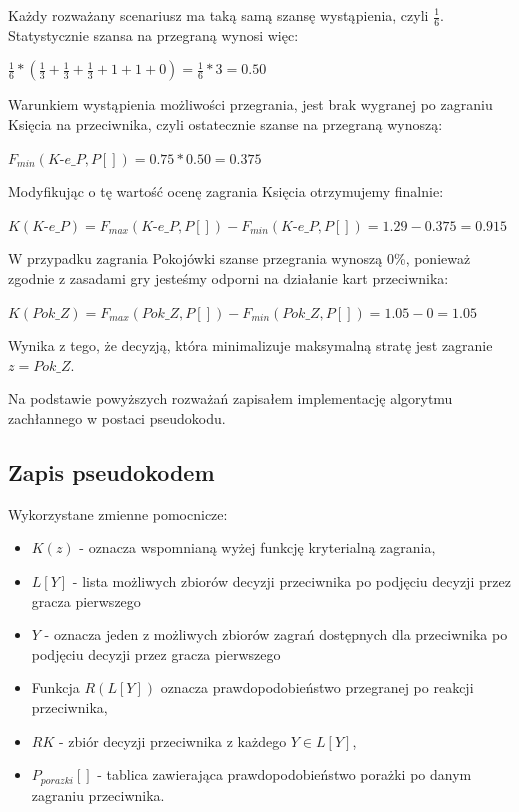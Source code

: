 Każdy rozważany scenariusz ma taką samą szansę wystąpienia, czyli $\frac{1}{6}$. Statystycznie szansa na przegraną wynosi więc:
\begin{center}
 $\frac{1}{6} * (\frac{1}{3} + \frac{1}{3} + \frac{1}{3} + 1 + 1 + 0) = \frac{1}{6} * 3 = 0.50 $
\end{center}
Warunkiem wystąpienia możliwości przegrania, jest brak wygranej po zagraniu Księcia na przeciwnika, czyli ostatecznie szanse na przegraną wynoszą:
\begin{center}
	$F_{min}(\textit{K-e\_P}, P[]) = 0.75 * 0.50 = 0.375$
\end{center}
Modyfikując o tę wartość ocenę zagrania Księcia otrzymujemy finalnie:
\begin{center}
	$K(\textit{K-e\_P}) =  F_{max}(\textit{K-e\_P}, P[]) - F_{min}(\textit{K-e\_P}, P[]) = 1.29 - 0.375 = 0.915$
\end{center} 
W przypadku zagrania Pokojówki szanse przegrania wynoszą 0\%, ponieważ zgodnie z zasadami gry jesteśmy odporni na działanie kart przeciwnika:
\begin{center}
	$K(Pok\_Z) =  F_{max}(Pok\_Z, P[]) - F_{min}(Pok\_Z, P[]) = 1.05 - 0 = 1.05$
\end{center} 
Wynika z tego, że decyzją, która minimalizuje maksymalną stratę jest zagranie $z = Pok\_Z$.

Na podstawie powyższych rozważań zapisałem implementację algorytmu zachłannego w postaci pseudokodu.
\subsection{Zapis pseudokodem}
Wykorzystane zmienne pomocnicze:
\begin{itemize}
	\item $K(z)$ - oznacza wspomnianą wyżej funkcję kryterialną zagrania, 
	\item $L[Y]$ - lista możliwych zbiorów decyzji przeciwnika po podjęciu decyzji przez gracza pierwszego
	\item $Y$ - oznacza jeden z możliwych zbiorów zagrań dostępnych dla przeciwnika po podjęciu decyzji przez gracza pierwszego
	\item Funkcja $R(L[Y])$ oznacza prawdopodobieństwo przegranej po reakcji przeciwnika,
	\item $RK$ - zbiór decyzji przeciwnika z każdego $Y \in L[Y]$,
	\item $P_{porazki}[]$ - tablica zawierająca prawdopodobieństwo porażki po danym zagraniu przeciwnika.
\end{itemize}

